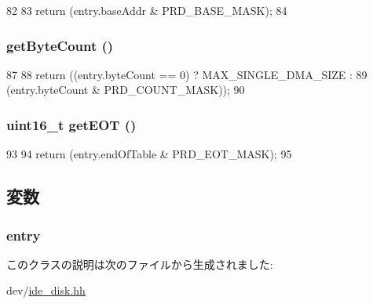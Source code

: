 \begin{DoxyCode}
82     {
83         return (entry.baseAddr & PRD_BASE_MASK);
84     }
\end{DoxyCode}
\hypertarget{classPrdTableEntry_aeb2b8df06bf82475ef82d84c80a61813}{
\subsubsection[{getByteCount}]{ getByteCount ()}}
\label{classPrdTableEntry_aeb2b8df06bf82475ef82d84c80a61813}



\begin{DoxyCode}
87     {
88         return ((entry.byteCount == 0) ? MAX_SINGLE_DMA_SIZE :
89                 (entry.byteCount & PRD_COUNT_MASK));
90     }
\end{DoxyCode}
\hypertarget{classPrdTableEntry_a15470a9b6762e3776b9cd784a74421c4}{
\subsubsection[{getEOT}]{\setlength{\rightskip}{0pt plus 5cm}uint16\_\-t getEOT ()}}
\label{classPrdTableEntry_a15470a9b6762e3776b9cd784a74421c4}



\begin{DoxyCode}
93     {
94         return (entry.endOfTable & PRD_EOT_MASK);
95     }
\end{DoxyCode}


\subsection{変数}
\hypertarget{classPrdTableEntry_a367da4f281ab033aae067ee206649f04}{
\subsubsection[{entry}]{ {\bf entry}}}
\label{classPrdTableEntry_a367da4f281ab033aae067ee206649f04}


このクラスの説明は次のファイルから生成されました:\begin{DoxyCompactItemize}
\item 
dev/\hyperlink{ide__disk_8hh}{ide\_\-disk.hh}\end{DoxyCompactItemize}
